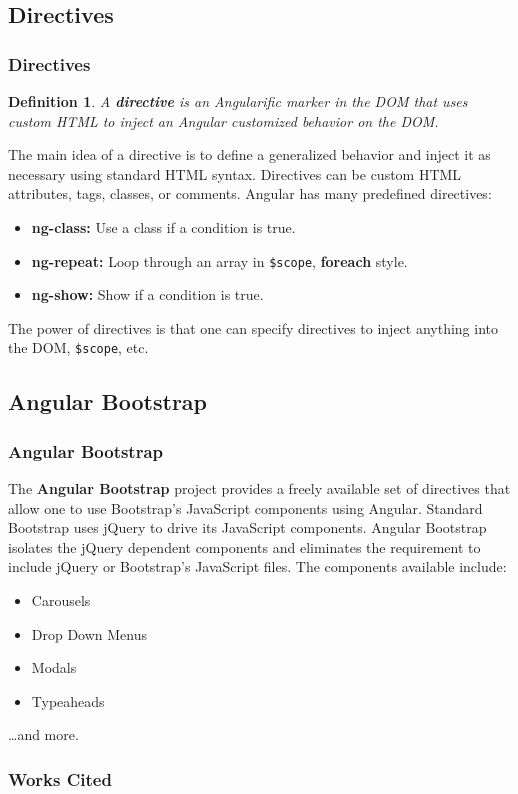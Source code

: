 \documentclass[aspectratio=169]{beamer}
\newtheorem{defn}{Definition}
\begin{document}
\subsection{Directives}
\begin{frame}
\frametitle{Directives}
\begin{defn}
A \textbf{directive} is an Angularific marker in the DOM that uses custom HTML to inject an Angular customized behavior on the DOM. 
\end{defn}
The main idea of a directive is to define a generalized behavior and inject it as necessary using standard HTML syntax. \cite{directives} Directives can be custom HTML attributes, tags, classes, or comments. Angular has many predefined directives:

\begin{itemize}
	\item \textbf{ng-class:} Use a class if a condition is true.
	\item \textbf{ng-repeat:} Loop through an array in \texttt{\$scope}, \textbf{foreach} style.
	\item \textbf{ng-show:} Show if a condition is true.
\end{itemize}

The power of directives is that one can specify directives to inject anything into the DOM, \texttt{\$scope}, etc.
\end{frame}

\subsection{Angular Bootstrap}
\begin{frame}
\frametitle{Angular Bootstrap}
The \textbf{Angular Bootstrap} project provides a freely available set of directives that allow one to use Bootstrap's JavaScript components using Angular. Standard Bootstrap uses jQuery to drive its JavaScript components. Angular Bootstrap isolates the jQuery dependent components and eliminates the requirement to include jQuery or Bootstrap's JavaScript files. The components available include:

\begin{itemize}
	\item Carousels
	\item Drop Down Menus
	\item Modals
	\item Typeaheads
\end{itemize}

\dots and more. \cite{angular-bootstrap}
\end{frame}

\begin{frame}[allowframebreaks]
\frametitle{Works Cited}

\end{frame}
\end{document}
